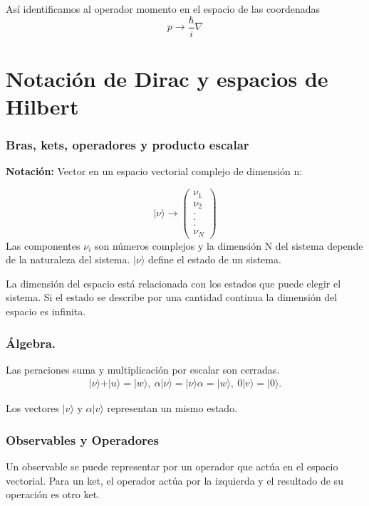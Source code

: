 \documentclass[a4,12pt]{aleph-notas}
\begin{document}
Así identificamos al operador momento en el espacio de las coordenadas
\begin{equation}
    p\rightarrow \frac{\hbar}{i}\nabla
\end{equation}

\section{Notación de Dirac y espacios de Hilbert}
\subsubsection{Bras, kets, operadores y producto escalar}
\textbf{Notación:} Vector en un espacio vectorial complejo de dimensión n:
\begin{multicols}{2}
    \begin{equation*}
        \vert \nu \rangle \rightarrow \begin{pmatrix}
            \nu_1\\ \nu_2\\ .\\.\\.\\\nu_N
        \end{pmatrix}
    \end{equation*}
    Las componentes $\nu_i$ son números complejos y la dimensión N del sistema depende de la naturaleza del sistema. $\vert \nu \rangle $ define el estado de un sistema.
\end{multicols}

La dimensión del espacio está relacionada con los estados que puede elegir el sistema. Si el estado se describe por una cantidad continua la dimensión del espacio es infinita.

\subsubsection{Álgebra.} Las peraciones suma y multiplicación por escalar son cerradas.
\begin{align*}
    \vert \nu \rangle+ \vert u \rangle = \vert w \rangle,  \ \alpha\vert\nu\rangle=\vert\nu\rangle\alpha=\vert w \rangle, \ 0\vert v \rangle = \vert 0 \rangle.
\end{align*}
\begin{advertencia}
    Los vectores $\vert v \rangle$ y $\alpha \vert v \rangle$ representan un mismo estado.
\end{advertencia}

\subsubsection{Observables y Operadores}
Un observable se puede representar por un operador que actúa en el espacio vectorial. Para un ket, el operador actúa por la izquierda y el resultado de su operación es otro ket.\\
\end{document}

